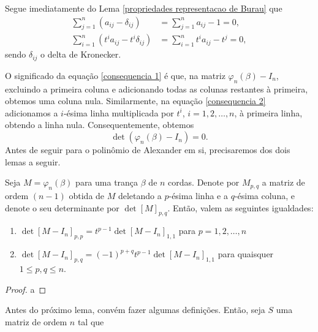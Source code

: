 	Segue imediatamente do Lema \ref{propriedades representacao de Burau} que
	\begin{align}
	\label{consequencia 1}
	    \sum_{j=1}^{n}(a_{ij} - \delta_{ij}) &= \sum_{j=1}^{n}a_{ij} - 1 = 0, \\ 
	\label{consequencia 2}
	    \sum_{i=1}^{n}(t^ia_{ij} - t^i\delta_{ij}) &= \sum_{i=1}^{n}t^ia_{ij} - t^j = 0,
	\end{align}
	sendo $\delta_{ij}$ o delta de Kronecker.
	
	\par\vspace{0.3cm} O significado da equação \eqref{consequencia 1} é que, 
	na matriz $\varphi_n(\beta) - I_n$, excluindo a primeira coluna e adicionando todas 
	as colunas restantes à primeira, obtemos uma coluna nula. Similarmente, na 
	equação \eqref{consequencia 2} adicionamos a $i$-ésima linha multiplicada por 
	$t^i$, $i=1,2,\dots,n$, à primeira linha, obtendo a linha nula. Consequentemente, obtemos
	\begin{equation*}
	    \det(\varphi_n(\beta) - I_n) = 0.
	\end{equation*}
	Antes de seguir para o polinômio de Alexander em si, precisaremos dos dois lemas a seguir.
	\begin{lemma}
	\label{exercicio}
		Seja $M = \varphi_n(\beta)$ para uma trança $\beta$ de $n$ cordas. 
		Denote por $M_{p,q}$ a matriz de ordem $(n-1)$ obtida de $M$ deletando a $p$-ésima 
		linha e a $q$-ésima coluna, e denote o seu determinante por $\det[M]_{p,q}$. 
		Então, valem as seguintes igualdades:
		\begin{enumerate}
			\item $\det[M - I_n]_{p,p} = t^{p-1}\det[M - I_n]_{1,1}$ para $p=1,2,\dots,n$
			\item $\det[M - I_n]_{p,q} = (-1)^{p+q}t^{p-1}\det[M - I_n]_{1,1}$ para quaisquer $1\leq p,q\leq n$.
		\end{enumerate}
	\end{lemma}
	\begin{proof}
		a
	\end{proof}
	Antes do próximo lema, convém fazer algumas definições. Então, seja $S$ uma matriz de ordem $n$ tal que
